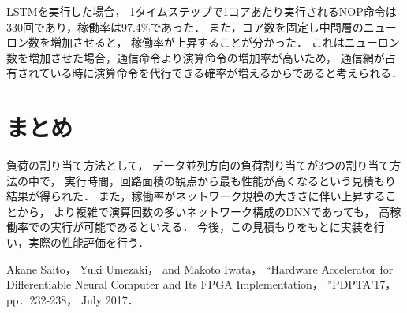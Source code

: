 \documentclass[a4j]{jarticle}
\begin{document}
\begin{Abstract}
LSTMを実行した場合，
1タイムステップで1コアあたり実行されるNOP命令は330回であり，稼働率は97.4\%であった．
また，コア数を固定し中間層のニューロン数を増加させると，
稼働率が上昇することが分かった．
これはニューロン数を増加させた場合，通信命令より演算命令の増加率が高いため，
通信網が占有されている時に演算命令を代行できる確率が増えるからであると考えられる．

 \section{まとめ}
負荷の割り当て方法として，
データ並列方向の負荷割り当てが3つの割り当て方法の中で，
実行時間，回路面積の観点から最も性能が高くなるという見積もり結果が得られた．
また，稼働率がネットワーク規模の大きさに伴い上昇することから，
より複雑で演算回数の多いネットワーク構成のDNNであっても，
高稼働率での実行が可能であるといえる．
今後，この見積もりをもとに実装を行い，実際の性能評価を行う．


\begin{thebibliography}{99}
  Akane Saito， Yuki Umezaki， and Makoto Iwata，
  ``Hardware Accelerator for Differentiable Neural Computer and Its FPGA Implementation，
  ''PDPTA'17， pp．232-238， July 2017．
\end{thebibliography}

\end{Abstract}
\end{document}
